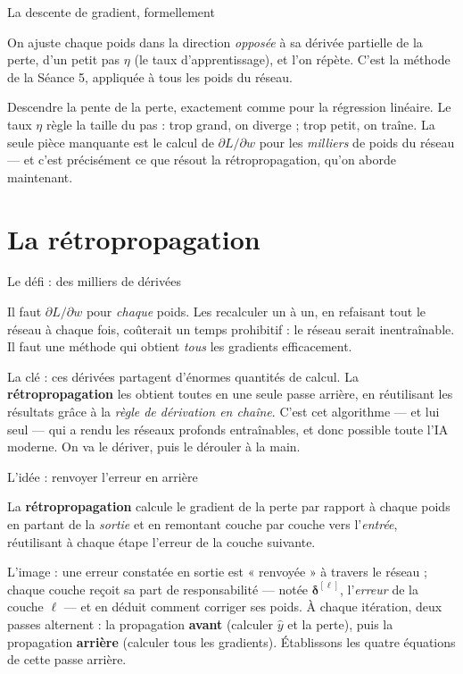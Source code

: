 \documentclass[aspectratio=169,11pt]{beamer}
\newcommand{\vd}{\boldsymbol{\delta}}
\begin{document}
\begin{frame}{La descente de gradient, formellement}
\begin{ucaddef}
{\small On ajuste chaque poids dans la direction \emph{opposée} à sa dérivée partielle de la perte, d'un petit pas $\eta$ (le taux d'apprentissage), et l'on répète. C'est la méthode de la Séance 5, appliquée à tous les poids du réseau.}
\end{ucaddef}
{\small Descendre la pente de la perte, exactement comme pour la régression linéaire. Le taux $\eta$ règle la taille du pas : trop grand, on diverge ; trop petit, on traîne. La seule pièce manquante est le calcul de $\partial L / \partial w$ pour les \emph{milliers} de poids du réseau — et c'est précisément ce que résout la rétropropagation, qu'on aborde maintenant.}
\end{frame}

\section{La rétropropagation}

\begin{frame}{Le défi : des milliers de dérivées}
\begin{ucadpiege}
{\small Il faut $\partial L / \partial w$ pour \emph{chaque} poids. Les recalculer un à un, en refaisant tout le réseau à chaque fois, coûterait un temps prohibitif : le réseau serait inentraînable. Il faut une méthode qui obtient \emph{tous} les gradients efficacement.}
\end{ucadpiege}
{\small La clé : ces dérivées partagent d'énormes quantités de calcul. La \textbf{rétropropagation} les obtient toutes en une seule passe arrière, en réutilisant les résultats grâce à la \emph{règle de dérivation en chaîne}. C'est cet algorithme — et lui seul — qui a rendu les réseaux profonds entraînables, et donc possible toute l'IA moderne. On va le dériver, puis le dérouler à la main.}
\end{frame}

\begin{frame}{L'idée : renvoyer l'erreur en arrière}
\begin{ucaddef}
{\small La \textbf{rétropropagation} calcule le gradient de la perte par rapport à chaque poids en partant de la \emph{sortie} et en remontant couche par couche vers l'\emph{entrée}, réutilisant à chaque étape l'erreur de la couche suivante.}
\end{ucaddef}
{\small L'image : une erreur constatée en sortie est « renvoyée » à travers le réseau ; chaque couche reçoit sa part de responsabilité — notée $\vd^{[\ell]}$, l'\emph{erreur} de la couche $\ell$ — et en déduit comment corriger ses poids. À chaque itération, deux passes alternent : la propagation \textbf{avant} (calculer $\hat y$ et la perte), puis la propagation \textbf{arrière} (calculer tous les gradients). Établissons les quatre équations de cette passe arrière.}
\end{frame}
\end{document}
